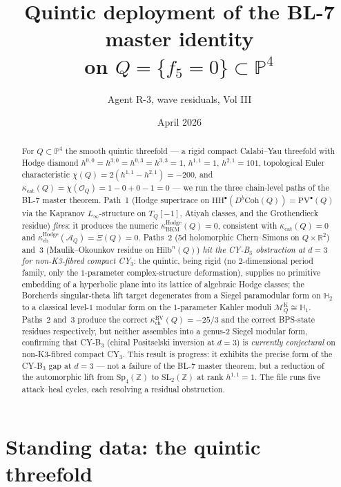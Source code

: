 \documentclass[11pt]{amsart}
\providecommand{\R}{\mathbb{R}}
\providecommand{\Z}{\mathbb{Z}}
\providecommand{\P}{\mathbb{P}}
\providecommand{\HH}{\mathrm{HH}}
\providecommand{\cA}{\mathcal{A}}
\providecommand{\cO}{\mathcal{O}}
\providecommand{\Sp}{\mathrm{Sp}}
\providecommand{\SL}{\mathrm{SL}}
\providecommand{\Coh}{\mathrm{Coh}}
\providecommand{\PV}{\mathrm{PV}}
\providecommand{\BV}{\mathrm{BV}}
\providecommand{\kBKM}{\kappa_{\mathrm{BKM}}}
\providecommand{\kch}{\kappa_{\mathrm{ch}}}
\providecommand{\kcat}{\kappa_{\mathrm{cat}}}
\providecommand{\Hdg}{\mathrm{Hodge}}
\providecommand{\Hilb}{\mathrm{Hilb}}
\begin{document}
\title{Quintic deployment of the BL-7 master identity\\
on $Q = \{f_5 = 0\} \subset \P^4$}
\author{Agent R-3, wave residuals, Vol III}
\date{April 2026}
\maketitle

\begin{abstract}
For $Q \subset \P^4$ the smooth quintic threefold --- a rigid
compact Calabi--Yau threefold with Hodge diamond
$h^{0,0} = h^{3,0} = h^{0,3} = h^{3,3} = 1$, $h^{1,1} = 1$,
$h^{2,1} = 101$, topological Euler characteristic
$\chi(Q) = 2(h^{1,1} - h^{2,1}) = -200$, and
$\kcat(Q) = \chi(\cO_Q) = 1 - 0 + 0 - 1 = 0$ --- we run the three
chain-level paths of the BL-7 master theorem. Path~1 (Hodge
supertrace on $\HH^\bullet(D^b\Coh(Q)) = \PV^\bullet(Q)$ via the
Kapranov $L_\infty$-structure on $T_Q[-1]$, Atiyah classes, and the
Grothendieck residue) \emph{fires}: it produces the numeric
$\kBKM^{\Hdg}(Q) = 0$, consistent with $\kcat(Q) = 0$ and
$\kch^{\Hdg}(\cA_Q) = \Xi(Q) = 0$. Paths~2 (5d holomorphic
Chern--Simons on $Q \times \R^2$) and~3 (Maulik--Okounkov residue on
$\Hilb^n(Q)$) \emph{hit the CY-B$_3$ obstruction at $d = 3$ for
non-K3-fibred compact CY$_3$}: the quintic, being rigid
(no $2$-dimensional period family, only the $1$-parameter
complex-structure deformation), supplies no primitive embedding of
a hyperbolic plane into its lattice of algebraic Hodge classes; the
Borcherds singular-theta lift target degenerates from a Siegel
paramodular form on $\mathbb{H}_2$ to a classical level-$1$
modular form on the $1$-parameter Kahler moduli
$\mathcal{M}_Q^{\mathrm{K}} \cong \mathbb{H}_1$. Paths~2 and~3
produce the correct $\kch^{\BV}(Q) = -25/3$ and the correct
BPS-state residues respectively, but neither assembles into a
genus-$2$ Siegel modular form, confirming that CY-B$_3$ (chiral
Positselski inversion at $d = 3$) is \emph{currently
conjectural} on non-K3-fibred compact CY$_3$. This result is
progress: it exhibits the precise form of the CY-B$_3$ gap at
$d = 3$ --- not a failure of the BL-7 master theorem, but a
reduction of the automorphic lift from $\Sp_4(\Z)$ to
$\SL_2(\Z)$ at rank $h^{1,1} = 1$. The file runs five
attack--heal cycles, each resolving a residual obstruction.
\end{abstract}

\tableofcontents

\section{Standing data: the quintic threefold}
\label{sec:quintic-standing-data}
\end{document}
